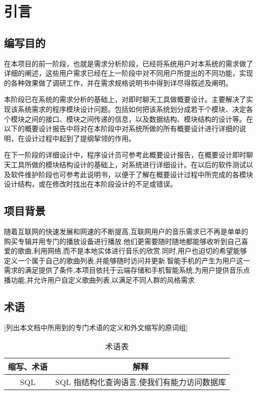 \chapter{引言}
\section{编写目的}
在本项目的前一阶段，也就是需求分析阶段，已经将系统用户对本系统的需求做了详细的阐述，这些用户需求已经在上一阶段中对不同用户所提出的不同功能，实现的各种效果做了调研工作，并在需求规格说明书中得到详尽得叙述及阐明。

本阶段已在系统的需求分析的基础上，对即时聊天工具做概要设计。主要解决了实现该系统需求的程序模块设计问题。包括如何把该系统划分成若干个模块、决定各个模块之间的接口、模块之间传递的信息，以及数据结构、模块结构的设计等。在以下的概要设计报告中将对在本阶段中对系统所做的所有概要设计进行详细的说明，在设计过程中起到了提纲挈领的作用。

在下一阶段的详细设计中，程序设计员可参考此概要设计报告，在概要设计即时聊天工具所做的模块结构设计的基础上，对系统进行详细设计。在以后的软件测试以及软件维护阶段也可参考此说明书，以便于了解在概要设计过程中所完成的各模块设计结构，或在修改时找出在本阶段设计的不足或错误。


\section{项目背景}
随着互联网的快速发展和网速的不断提高,互联网用户的音乐需求已不再是单单的购买专辑并用专门的播放设备进行播放.他们更需要随时随地都能够收听到自己喜爱的歌曲,利用网络,而不是本地实体进行音乐的欣赏.同时,用户也迫切的希望能够定义一个属于自己的歌曲列表,并能够随时访问并更新.智能手机的产生为用户这一需求的满足提供了条件,本项目依托于云端存储和手机智能系统,为用户提供音乐点播功能,并允许用户自定义歌曲列表,以满足不同人群的风格需求.

\section{术语}
[列出本文档中所用到的专门术语的定义和外文缩写的原词组]
\begin{table}[htbp]
\centering
\caption{术语表} \label{tab:terminology}
\begin{tabular}{|c|c|}
    \hline
    缩写、术语 & 解释 \\
    \hline
    SQL & SQL 指结构化查询语言,使我们有能力访问数据库 \\
    \hline
\end{tabular}
\end{table}